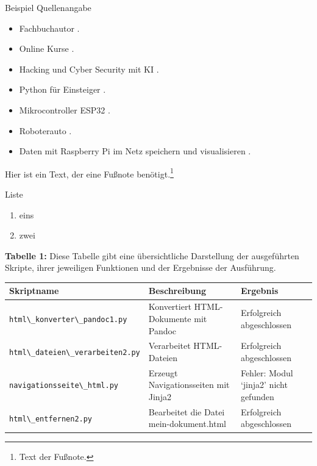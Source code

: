\documentclass{vorlage-design-main}
\begin{document}
Beispiel Quellenangabe

\begin{itemize}

\item
  Fachbuchautor \textcite{dalwigk:2024:fachbuchautor}.
\item
  Online Kurse \textcite{schaffranek:2024:kurse}.
\item
  Hacking und Cyber Security mit KI \textcite{dalwigk:2023:hacking}.
\item
  Python für Einsteiger \textcite{dalwigk:2022:python}.
\item
  Mikrocontroller ESP32 \textcite{brandes:2023:mikrocontroller}.
\item
  Roboterauto \textcite{brandes:2022:esp32}.
\item
  Daten mit Raspberry Pi im Netz speichern und visualisieren
  \textcite{brandes:2023:daten}.
\end{itemize}

Hier ist ein Text, der eine Fußnote benötigt.\footnote{Text der Fußnote.}

Liste

\begin{enumerate}
\def\labelenumi{\arabic{enumi}.}

\item
  eins
\item
  zwei
\end{enumerate}

\textbf{Tabelle 1:} Diese Tabelle gibt eine übersichtliche Darstellung
der ausgeführten Skripte, ihrer jeweiligen Funktionen und der Ergebnisse
der Ausführung.

\begin{table}[ht]
  \begin{tabular}{@{}lll@{}}
\toprule
Skriptname
 & 
Beschreibung
 & 
Ergebnis
 \\
\midrule[\heavyrulewidth]
\verb|html\_konverter\_pandoc1.py| & Konvertiert
HTML-Dokumente mit Pandoc & Erfolgreich abgeschlossen \\
\verb|html\_dateien\_verarbeiten2.py| & Verarbeitet
HTML-Dateien & Erfolgreich abgeschlossen \\
\verb|navigationsseite\_html.py| & Erzeugt
Navigationsseiten mit Jinja2 & Fehler: Modul `jinja2' nicht gefunden \\
\verb|html\_entfernen2.py| & Bearbeitet die Datei
mein-dokument.html & Erfolgreich abgeschlossen \\
\bottomrule
\end{tabular}%
\end{table}
\end{document}
